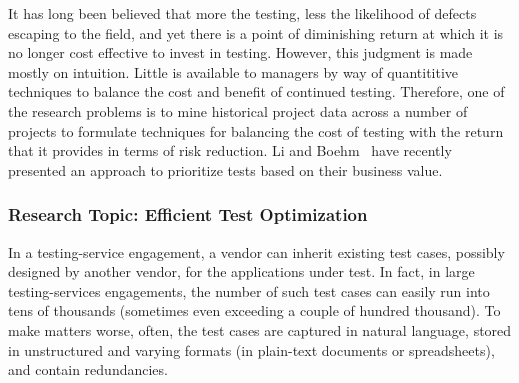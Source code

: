It has long been believed that more the testing, less the likelihood of defects
escaping to the field, and yet there is a point of diminishing return at which
it is no longer cost effective to invest in testing.  However, this judgment is
made mostly on intuition.  Little is available to managers by way of
quantititive techniques to balance the cost and benefit of continued testing.
Therefore, one of the research problems is to mine historical project data
across a number of projects to formulate techniques for balancing the cost of
testing with the return that it provides in terms of risk reduction.  Li and
Boehm~\cite{Li:2013} have recently presented an approach to prioritize tests
based on their business value.


\subsubsection*{Research Topic: Efficient Test Optimization}

In a testing-service engagement, a vendor can inherit existing test cases,
possibly designed by another vendor, for the applications under test. In fact,
in large testing-services engagements, the number of such test cases can easily
run into tens of thousands (sometimes even exceeding a couple of hundred
thousand).  To make matters worse, often, the test cases are captured in natural
language, stored in unstructured and varying formats (\eg in plain-text
documents or spreadsheets), and contain redundancies. 

